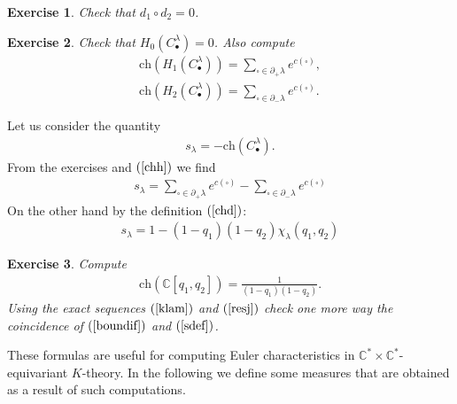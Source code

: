 \documentclass[12pt]{article}
\newtheorem{exer}{Exercise}[section]
\numberwithin{equation}{section}
\theoremstyle{definition}
\begin{document}
\begin{exer}
    Check that $d_1 \circ d_{2} = 0$.
\end{exer}
\begin{exer}
    Check that $H_{0}(C^{\lambda}_{\bullet}) = 0$. Also compute
    \begin{align*}
        \mathrm{ch} (H_{1}(C^{\lambda}_{\bullet})) = \sum\limits_{\square \in \partial_{+} \lambda} e^{c(\square)},\\
        \mathrm{ch} (H_{2}(C^{\lambda}_{\bullet})) = \sum\limits_{\square \in \partial_{-}\lambda} e^{c(\square)}.
    \end{align*}
\end{exer}
Let us consider the quantity
\begin{align*}
    s_{\lambda} = - \mathrm{ch}(C^{\lambda}_{\bullet}).
\end{align*}
From the exercises and $(\ref{chh})$ we find
\begin{align}\label{boundif}
    s_{\lambda} = \sum\limits_{\square \in \partial_{+} \lambda} e^{c(\square)} -\sum\limits_{\square \in \partial_{-}\lambda} e^{c(\square)}
\end{align}
On the other hand by the definition $(\ref{chd})$:
\begin{align}\label{sdef}
    s_{\lambda} = 1 - (1 - q_1 )(1 - q_2 )\chi _{\lambda}(q_1 , q_2 ) 
\end{align}
\begin{exer}\normalfont
    Compute
    \begin{align}
        \mathrm{ch} ( \mathbb{C}[q_1 , q_2 ] ) = \frac{1}{(1 - q_1 )(1 - q_2 )}.
    \end{align}
Using the exact sequences $(\ref{klam})$ and $(\ref{resj})$ check one more way the coincidence of $(\ref{boundif})$ and $(\ref{sdef})$.
\end{exer}
These formulas are useful for computing Euler characteristics in $\mathbb{C}^{*}\times\mathbb{C}^{*}$-equivariant $K$-theory. In the following we define some measures that are obtained as a result of such computations.
\end{document}
